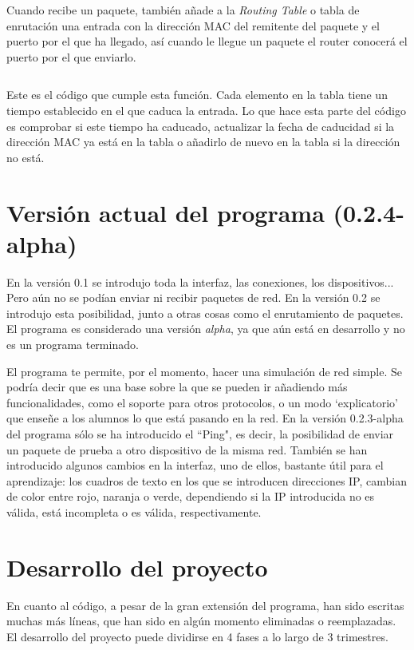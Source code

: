 \documentclass[a4paper, 11pt]{report} %
\begin{document}
Cuando recibe un paquete, también añade a la \textit{Routing Table} o tabla de enrutación una entrada con la dirección MAC del remitente del paquete y el puerto por el que ha llegado, así cuando le llegue un paquete el router conocerá el puerto por el que enviarlo.
\inputminted[firstline=1231, lastline=1247, baselinestretch=1,fontsize=\scriptsize, linenos,breaklines]{python}{Codigo/invproy/main.py}
Este es el código que cumple esta función. Cada elemento en la tabla tiene un tiempo establecido en el que caduca la entrada. Lo que hace esta parte del código es comprobar si este tiempo ha caducado, actualizar la fecha de caducidad si la dirección MAC ya está en la tabla o añadirlo de nuevo en la tabla si la dirección no está.

\section{Versión actual del programa (0.2.4-alpha)}
\label{01}
En la versión 0.1 se introdujo toda la interfaz, las conexiones, los dispositivos... Pero aún no se podían enviar ni recibir paquetes de red. En la versión 0.2 se introdujo esta posibilidad, junto a otras cosas como el enrutamiento de paquetes. El programa es considerado una versión \textit{alpha}, ya que aún está en desarrollo y no es un programa terminado.

El programa te permite, por el momento, hacer una simulación de red simple. Se podría decir que es una base sobre la que se pueden ir añadiendo más funcionalidades, como el soporte para otros protocolos, o un modo `explicatorio' que enseñe a los alumnos lo que está pasando en la red. En la versión 0.2.3-alpha del programa sólo se ha introducido el ``Ping", es decir, la posibilidad de enviar un paquete de prueba a otro dispositivo de la misma red. También se han introducido algunos cambios en la interfaz, uno de ellos, bastante útil para el aprendizaje: los cuadros de texto en los que se introducen direcciones IP, cambian de color entre rojo, naranja o verde, dependiendo si la IP introducida no es válida, está incompleta o es válida, respectivamente.

\section{Desarrollo del proyecto}
En cuanto al código, a pesar de la gran extensión del programa, han sido escritas muchas más líneas, que han sido en algún momento eliminadas o reemplazadas. El desarrollo del proyecto puede dividirse en 4 fases a lo largo de 3 trimestres.
\end{document}
